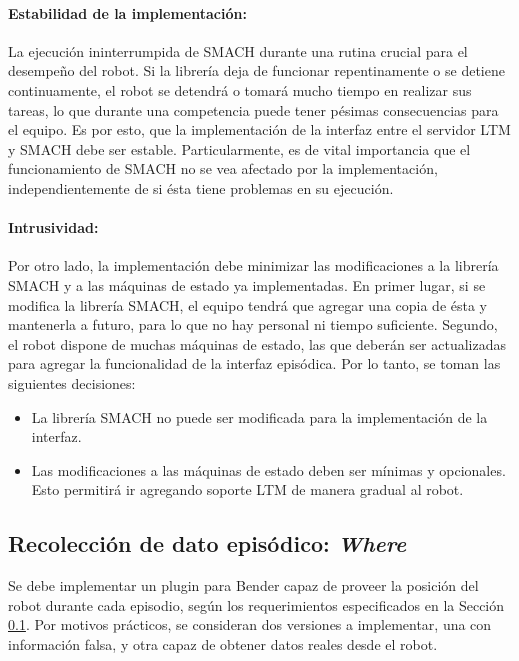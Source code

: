 \paragraph{Estabilidad de la implementación:}
La ejecución ininterrumpida de SMACH durante una rutina crucial para el desempeño del robot. Si la librería deja de funcionar repentinamente o se detiene continuamente, el robot se detendrá o tomará mucho tiempo en realizar sus tareas, lo que durante una competencia puede tener pésimas consecuencias para el equipo. Es por esto, que la implementación de la interfaz entre el servidor LTM y SMACH debe ser estable. Particularmente, es de vital importancia que el funcionamiento de SMACH no se vea afectado por la implementación, independientemente de si ésta tiene problemas en su ejecución. 


\paragraph{Intrusividad:}
Por otro lado, la implementación debe minimizar las modificaciones a la librería SMACH y a las máquinas de estado ya implementadas. En primer lugar, si se modifica la librería SMACH, el equipo tendrá que agregar una copia de ésta y mantenerla a futuro, para lo que no hay personal ni tiempo suficiente. Segundo, el robot dispone de muchas máquinas de estado, las que deberán ser actualizadas para agregar la funcionalidad de la interfaz episódica. Por lo tanto, se toman las siguientes decisiones:
\begin{itemize}
\item La librería SMACH no puede ser modificada para la implementación de la interfaz.
\item Las modificaciones a las máquinas de estado deben ser mínimas y opcionales. Esto permitirá ir agregando soporte LTM de manera gradual al robot.
\end{itemize}



\subsection{Recolección de dato episódico: \textit{Where}}

Se debe implementar un plugin para Bender capaz de proveer la posición del robot durante cada episodio, según los requerimientos especificados en la Sección \ref{}. Por motivos prácticos, se consideran dos versiones a implementar, una con información falsa, y otra capaz de obtener datos reales desde el robot.


